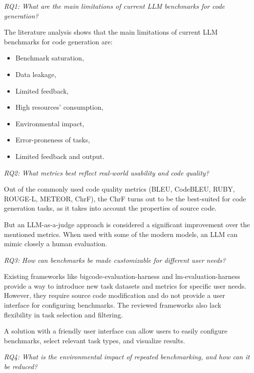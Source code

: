 
\textit{RQ1: What are the main limitations of current LLM benchmarks for code generation?}

The literature analysis shows that the main limitations of current LLM benchmarks for code generation are:

\begin{itemize}
    \item Benchmark saturation,
    \item Data leakage,
    \item Limited feedback,
    \item High resources' consumption,
    \item Environmental impact,
    \item Error-proneness of tasks,
    \item Limited feedback and output.
\end{itemize}

\textit{RQ2: What metrics best reflect real-world usability and code quality?}

Out of the commonly used code quality metrics (BLEU, CodeBLEU, RUBY, ROUGE-L, METEOR, ChrF), the ChrF turns out to be the best-suited for code generation tasks, as it takes into account the properties of source code.

But an LLM-as-a-judge approach is considered a significant improvement over the mentioned metrics.
When used with some of the modern models, an LLM can mimic closely a human evaluation.

\textit{RQ3: How can benchmarks be made customizable for different user needs?}

Existing frameworks like bigcode-evaluation-harness and lm-evaluation-harness provide a way to introduce new task datasets and metrics for specific user needs.
However, they require source code modification and do not provide a user interface for configuring benchmarks.
The reviewed frameworks also lack flexibility in task selection and filtering.

A solution with a friendly user interface can allow users to easily configure benchmarks, select relevant task types, and visualize results.

\textit{RQ4: What is the environmental impact of repeated benchmarking, and how can it be reduced?}

